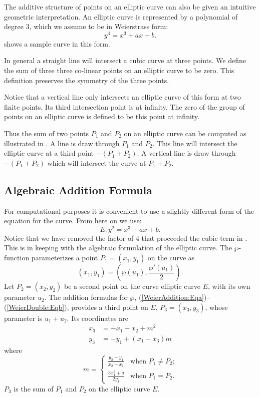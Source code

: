 The additive structure of points on an elliptic curve can also be
given an intuitive geometric interpretation.  An elliptic curve is
represented by a polynomial of degree $3$, which we assume to be in
Weierstrass form:
\[
y^3 = x^3 + ax + b.
\]
 shows a sample curve in this form. 

In general a straight line will intersect a cubic curve at three
points.  We define the sum of three three co-linear points on an
elliptic curve to be zero. This definition preserves the symmetry of
the three points.

Notice that a vertical line only intersects an elliptic curve of this
form at two finite points.  Its third intersection point is at
infinity.  The zero of the group of points on an elliptic curve is
defined to be this point at infinity.

Thus the sum of two points $P_1$ and $P_2$ on an elliptic curve can be
computed as illustrated in .  A line is
draw through $P_1$ and $P_2$.  This line will intersect the elliptic
curve at a third point $-(P_1+P_2)$.  A vertical line is draw through
$-(P_1+P_2)$ which will intersect the curve at $P_1+P_2$.

\subsection{Algebraic Addition Formula}
\label{Elliptic:Alg:Add:Sec}

For computational purposes it is convenient to use a slightly different
form of the equation for the curve.  From here on we use:
\begin{equation} \label{El:WeierForm:Eq}
E : y^2 = x^3 + a x + b.
\end{equation}
Notice that we have removed the factor of $4$ that proceeded the cubic
term in .  This is in keeping with the algebraic
formulation of the elliptic curve.  The $\wp$-function parameterizes a
point $P_1 = (x_1, y_1)$ on the curve as
\[
(x_1, y_1) = (\wp(u_1), \frac{\wp'(u_1)}{2}).
\]
Let $P_2 = (x_2, y_2)$ be a second point on the curve elliptic curve
$E$, with its own parameter $u_2$.  The addition formulas for $\wp$,
(\ref{WeierAddition:Eqa})--(\ref{WeierDouble:Eqb}), provides a third
point on $E$, $P_3 = (x_3, y_3)$, whose parameter is $u_1 + u_2$.
Its coordinates are
\[
\begin{aligned}
x_3 &= - x_1 - x_2 + m^2 \\
y_3 &= - y_1 + (x_1 - x_3) m
\end{aligned}
\]
where
\[
m = 
  \begin{cases}
    \displaystyle \frac{y_2 - y_1}{x_2 - x_1}& \mbox{when $P_1 \not= P_2$;}\\
    \displaystyle \frac{3 x_1^2 + a}{2 y_1}  & \mbox{when $P_1 = P_2$.}
  \end{cases}
\]
$P_3$ is the sum of $P_1$ and $P_2$ on the elliptic curve $E$.  

